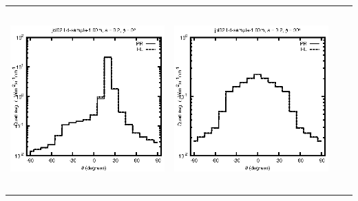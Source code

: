 \begin{tabular}{c c c c}
\includegraphics[height=7cm]{../eps/jol02_Ld_sample_1.00m_fwd.eps} &
\includegraphics[height=7cm]{../eps/jol02_Ld_sample_1.00m_cross.eps} \\
\end{tabular}

\pagebreak

